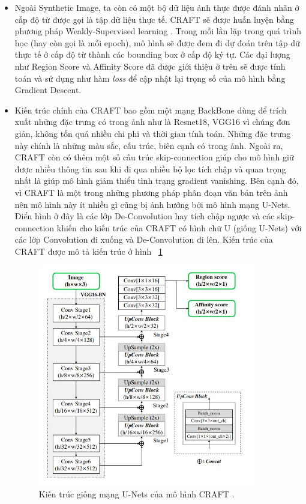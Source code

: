 \begin{itemize}
\item Ngoài Synthetic Image, ta còn có một bộ dữ liệu ảnh thực được đánh nhãn ở cấp độ
từ được gọi là tập dữ liệu thực tế. CRAFT\cite{baek2019character} sẽ được huấn luyện bằng phương pháp
Weakly-Supervised learning \cite{zhou2018brief}. Trong mỗi lần lặp trong quá trình học (hay còn gọi là
mỗi epoch), mô hình sẽ được đem đi dự đoán trên tập dữ thực tế ở cấp độ từ thành
các bounding box ở cấp độ ký tự. Các đại lượng như Region Score và Affinity Score
đã được giới thiệu ở trên sẽ được tính toán và sử dụng như hàm \textit{loss} để cập nhật lại
trọng số của mô hình bằng Gradient Descent.
\item Kiến trúc chính của CRAFT bao gồm một mạng BackBone dùng để trích xuất những
đặc trưng có trong ảnh như là Resnet18, VGG16 vì chúng đơn giản, không tốn quá
nhiều chi phi và thời gian tính toán. Những đặc trưng này chính là những màu sắc,
cấu trúc, biên cạnh có trong ảnh. Ngoài ra, CRAFT \cite{baek2019character} còn có thêm một số cấu trúc
skip-connection giúp cho mô hình giữ được nhiều thông tin sau khi đi qua nhiều bộ
lọc tích chập và quan trọng nhất là giúp mô hình giảm thiểu tình trạng gradient
vanishing. Bên cạnh đó, vì CRAFT là một trong những phương pháp phân đoạn văn
bản trên ảnh nên mô hình này ít nhiều gì cũng bị ảnh hưởng bởi mô hình mạng
U-Nets. Điển hình ở đây là các lớp De-Convolution hay tích chập ngược và các
skip-connection khiến cho kiến trúc của CRAFT có hình chữ U (giống U-Nets) với các
lớp Convolution đi xuống và De-Convolution đi lên. Kiến trúc của CRAFT \cite{baek2019character} được mô tả kiến trúc ở hình ~\ref{fig_2.7}

\begin{figure}
\centering
\includegraphics[width=0.9\textwidth]{mep_img/Capture4.JPG}
\caption{Kiến trúc giống mạng U-Nets của mô hình CRAFT \cite{baek2019character}. }\label{fig_2.7}
\end{figure}

\end{itemize}
